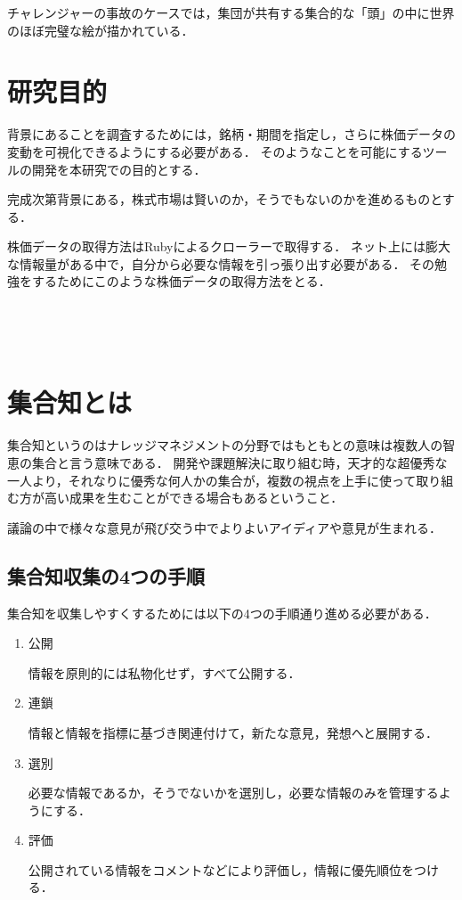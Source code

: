 チャレンジャーの事故のケースでは，集団が共有する集合的な「頭」の中に世界のほぼ完璧な絵が描かれている\cite{miyake2}．



\chapter{研究目的}


背景にあることを調査するためには，銘柄・期間を指定し，さらに株価データの変動を可視化できるようにする必要がある．
そのようなことを可能にするツールの開発を本研究での目的とする．

完成次第背景にある，株式市場は賢いのか，そうでもないのかを進めるものとする．


株価データの取得方法はRubyによるクローラーで取得する．
ネット上には膨大な情報量がある中で，自分から必要な情報を引っ張り出す必要がある．
その勉強をするためにこのような株価データの取得方法をとる．

　　　　　　　　　


	　　　　　　　　　　　　　　　　　　　　　　　　　　　　　　　　　　　　　　　　　　　　　　　　　　　　　　　　　　　　　　　　　　　　　　　　　　　　　　　　　




\chapter{集合知とは}

集合知というのはナレッジマネジメントの分野ではもともとの意味は複数人の智恵の集合と言う意味である．
開発や課題解決に取り組む時，天才的な超優秀な一人より，それなりに優秀な何人かの集合が，複数の視点を上手に使って取り組む方が高い成果を生むことができる場合もあるということ．

議論の中で様々な意見が飛び交う中でよりよいアイディアや意見が生まれる．

\section{集合知収集の4つの手順}
集合知を収集しやすくするためには以下の4つの手順通り進める必要がある．
\begin{enumerate}
  \item 公開

情報を原則的には私物化せず，すべて公開する．

  \item 連鎖

情報と情報を指標に基づき関連付けて，新たな意見，発想へと展開する．

  \item 選別

必要な情報であるか，そうでないかを選別し，必要な情報のみを管理するようにする．
  \item 評価

公開されている情報をコメントなどにより評価し，情報に優先順位をつける．




\end{enumerate}


